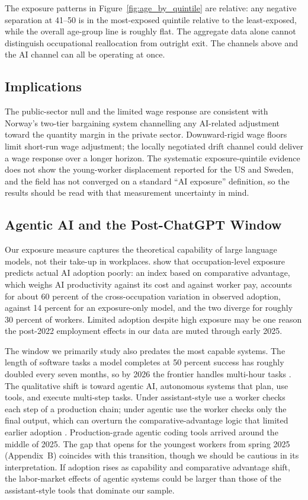 \documentclass[12pt]{article}
\begin{document}
The exposure patterns in Figure~\ref{fig:age_by_quintile} are relative: any negative separation at 41--50 is in the most-exposed quintile relative to the least-exposed, while the overall age-group line is roughly flat. The aggregate data alone cannot distinguish occupational reallocation from outright exit. The channels above and the AI channel can all be operating at once.


\subsection{Implications}\label{sec:discussion:implications}

The public-sector null and the limited wage response are consistent with Norway's two-tier bargaining system \citep{bhuller2022} channelling any AI-related adjustment toward the quantity margin in the private sector. Downward-rigid wage floors limit short-run wage adjustment; the locally negotiated drift channel could deliver a wage response over a longer horizon. The systematic exposure-quintile evidence does not show the young-worker displacement reported for the US and Sweden, and the field has not converged on a standard ``AI exposure'' definition, so the results should be read with that measurement uncertainty in mind.


\subsection{Agentic AI and the Post-ChatGPT Window}\label{sec:discussion:agentic}

Our exposure measure captures the theoretical capability of large language models, not their take-up in workplaces. \citet{lindenlaub2026} show that occupation-level exposure predicts actual AI adoption poorly: an index based on comparative advantage, which weighs AI productivity against its cost and against worker pay, accounts for about 60 percent of the cross-occupation variation in observed adoption, against 14 percent for an exposure-only model, and the two diverge for roughly 30 percent of workers. Limited adoption despite high exposure may be one reason the post-2022 employment effects in our data are muted through early 2025.

The window we primarily study also predates the most capable systems. The length of software tasks a model completes at 50 percent success has roughly doubled every seven months, so by 2026 the frontier handles multi-hour tasks \citep{metr2025}. The qualitative shift is toward agentic AI, autonomous systems that plan, use tools, and execute multi-step tasks. Under assistant-style use a worker checks each step of a production chain; under agentic use the worker checks only the final output, which can overturn the comparative-advantage logic that limited earlier adoption \citep{demirer2026}. Production-grade agentic coding tools arrived around the middle of 2025. The gap that opens for the youngest workers from spring 2025 (Appendix~B) coincides with this transition, though we should be cautious in its interpretation. If adoption rises as capability and comparative advantage shift, the labor-market effects of agentic systems could be larger than those of the assistant-style tools that dominate our sample.
\end{document}
